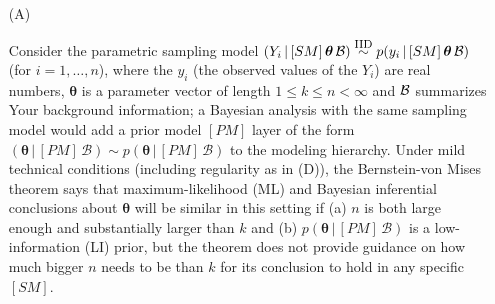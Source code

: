 \documentclass[12pt]{article}
\newcommand{\given}{\, | \,}
\begin{document}
\begin{itemize}

\item[(A)]

Consider the parametric sampling model $( Y_i \given [ SM ] \, \bm{ \theta } \, { \cal B } ) \stackrel{ \textrm{\footnotesize IID} }{ \sim } p ( y_i \given [ SM ] \, \bm{ \theta } \, { \cal B } )$ (for $i = 1, \dots, n$), where the $y_i$ (the observed values of the $Y_i$) are real numbers, $\bm{ \theta }$ is a parameter vector of length $1 \le k \le n < \infty$ and $\cal B$ summarizes Your background information; a Bayesian analysis with the same sampling model would add a prior model $[ PM ]$ layer of the form $( \bm{ \theta } \given [ PM ] \, \mathcal{ B } ) \sim p ( \bm{ \theta } \given [ PM ] \, \mathcal{ B } )$ to the modeling hierarchy. Under mild technical conditions (including regularity as in (D)), the Bernstein-von Mises theorem says that maximum-likelihood (ML) and Bayesian inferential conclusions about $\bm{ \theta }$ will be similar in this setting if (a) $n$ is both large enough and substantially larger than $k$ and (b) $p ( \bm{ \theta } \given [ PM ] \, \mathcal{ B }  )$ is a low-information (LI) prior, but the theorem does not provide guidance on how much bigger $n$ needs to be than $k$ for its conclusion to hold in any specific $[ SM ]$. 

\\


\end{itemize}
\end{document}
